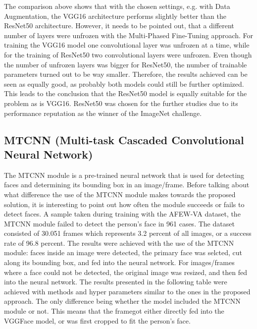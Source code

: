 The comparison above shows that with the chosen settings, e.g. with Data Augmentation, the VGG16 architecture performs slightly better than the ResNet50 architecture. However, it needs to be pointed out, that a different number of layers were unfrozen with the Multi-Phased Fine-Tuning approach. For training the VGG16 model one convolutional layer was unfrozen at a time, while for the training of ResNet50 two convolutional layers were unfrozen. Even though the number of unfrozen layers was bigger for ResNet50, the number of trainable parameters turned out to be way smaller. Therefore, the results achieved can be seen as equally good, as probably both models could still be further optimized. This leads to the conclusion that the ResNet50 model is equally suitable for the problem as is VGG16. ResNet50 was chosen for the further studies due to its performance reputation as the winner of the ImageNet challenge.

\subsection{MTCNN (Multi-task Cascaded Convolutional Neural Network)}
The MTCNN module is a pre-trained neural network that is used for detecting faces and determining its bounding box in an image/frame. Before talking about what difference the use of the MTCNN module makes towards the proposed solution, it is interesting to point out how often the module succeeds or fails to detect faces.
\newline\newline
A sample taken during training with the AFEW-VA dataset, the MTCNN module failed to detect the person's face in 961 cases. The dataset consisted of 30.051 frames which represents 3.2 percent of all images, or a success rate of 96.8 percent.
\newline\newline
The results were achieved with the use of the MTCNN module: faces inside an image were detected, the primary face was selcted, cut along its bounding box, and fed into the neural network. For images/frames where a face could not be detected, the original image was resized, and then fed into the neural network.
\newline\newline
The results presented in the following table were achieved with methods and hyper parameters similar to the ones in the proposed approach. The only difference being whether the model included the MTCNN module or not. This means that the framegot either directly fed into the VGGFace model, or was first cropped to fit the person's face.

